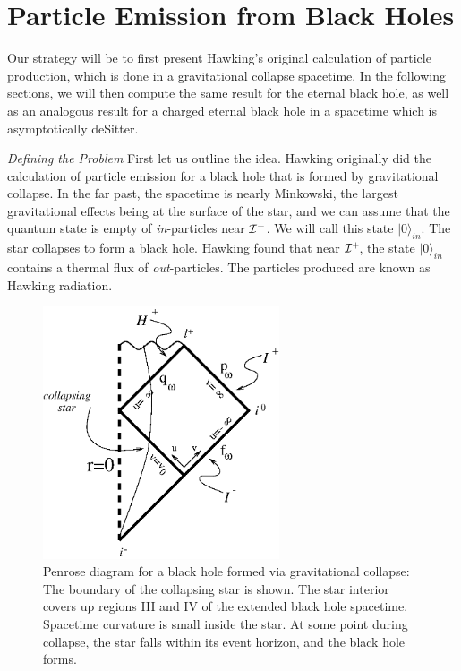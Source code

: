 \documentclass[12pt]{article}
\def\finf{{\cal I}^+}
\def\pinf{{\cal I}^-}
\def\vac{|0\rangle_{in} }
\begin{document}
\section{Particle Emission from Black Holes}

Our strategy will be to first present Hawking's original calculation of
particle production,
which is done in a gravitational collapse spacetime.  In the following
sections, we will then
compute the same result for the eternal black hole, as well as an analogous
result for a
charged eternal black hole in a  spacetime which is asymptotically deSitter.

\vskip 0.1in\noindent
{\it Defining the Problem}
\vskip 0.05in
First let us outline the idea.
Hawking \cite{hawking}  originally did the calculation of particle emission
for a black hole that is formed by gravitational collapse. In
the far past, the spacetime is nearly Minkowski, the largest gravitational
effects being at the surface of the star, and we can assume that the
quantum state is empty of {\it in}-particles near $\pinf$\!.
We will call this state $\vac$.
The star collapses to form a black hole.  Hawking found that near $\finf\!$,
the state $\vac$
contains a thermal flux of {\it out}-particles. The particles produced are
known as Hawking
radiation.
%
\begin{figure}[tb]
\begin{center}
\includegraphics[width=2.75in]{collapse.eps}
\end{center}
\caption{Penrose diagram for a black hole formed via gravitational
collapse: The boundary of
the collapsing star is shown. The star interior covers up
regions III and IV of the extended black hole spacetime. Spacetime
curvature is small inside the star.
At some point during collapse, the star falls within its event horizon,
and the black hole forms.}
\label{f4}
\end{figure}
%
%
\end{document}
